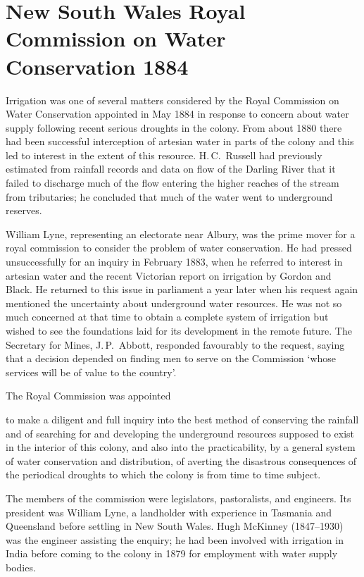 \section*{New South Wales Royal Commission on Water Conservation 1884}

Irrigation was one of several matters considered by the Royal
Commission on Water Conservation appointed in May 1884 in response to
concern about water supply following recent serious
droughts in the colony.  From about 1880 there had been
successful interception of artesian water in parts of the colony and
this led to interest in the extent of this resource.  H.\,C.~Russell
 had previously estimated from rainfall records
and data on flow of the Darling River  that it
failed to discharge much of the flow entering the higher reaches of
the stream from tributaries; he concluded that much of the water went
to underground reserves.

William Lyne,  representing an electorate near Albury,
was the prime mover for a royal commission to consider the problem of
water conservation.  He had pressed unsuccessfully for an inquiry in
February 1883, when he referred to interest in artesian water and the
recent Victorian report on irrigation by Gordon and Black.  He
returned to this issue in parliament a year later when his request
again mentioned the uncertainty about underground water resources.  He
was not so much concerned at that time to obtain a complete system of
irrigation but wished to see the foundations laid for its development
in the remote future.  The Secretary for Mines, J.\,P.~Abbott,
 responded favourably to the request, saying
that a decision depended on finding men to serve on the Commission
`whose services will be of value to the country'.

The Royal Commission was appointed
\begin{Quote}
	to make a diligent and full inquiry into the best method of
	conserving the rainfall and of searching for and developing
	the underground resources supposed to exist in the interior of
	this colo\-ny, and also into the practicability, by a general
	system of water conservation and distribution, of averting the
	disastrous consequ\-en\-ces of the periodical
	droughts to which the colony is from time to
	time subject.
\end{Quote}
The members of the commission were legislators, pastoralists, and
engineers. Its president was William Lyne, a landholder with
experience in Tasmania and Queensland before settling in New South
Wales. Hugh McKinney  (1847--1930) was the
engineer assisting the enquiry; he had been involved with irrigation
in India before coming to the colony in 1879 for employment with water
supply bodies.

